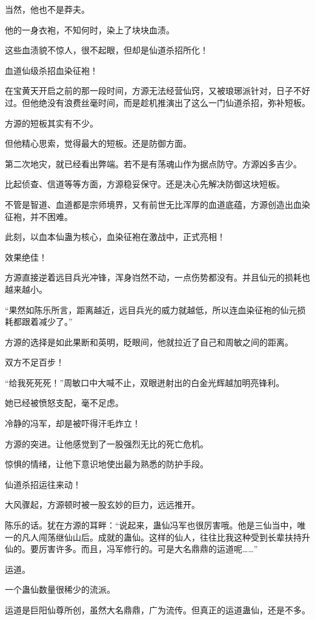 \begin{this_body}
当然，他也不是莽夫。

他的一身衣袍，不知何时，染上了块块血渍。

这些血渍貌不惊人，很不起眼，但却是仙道杀招所化！

血道仙级杀招血染征袍！

在宝黄天开启之前的那一段时间，方源无法经营仙窍，又被琅琊派针对，日子不好过。但他绝没有浪费丝毫时间，而是趁机推演出了这么一门仙道杀招，弥补短板。

方源的短板其实有不少。

但他精心思索，觉得最大的短板。还是防御方面。

第二次地灾，就已经看出弊端。若不是有荡魂山作为据点防守。方源凶多吉少。

比起侦查、信道等等方面，方源稳妥保守。还是决心先解决防御这块短板。

不管是智道、血道都是宗师境界，又有前世无比浑厚的血道底蕴，方源创造出血染征袍，并不困难。

此刻，以血本仙蛊为核心，血染征袍在激战中，正式亮相！

效果绝佳！

方源直接逆着远目兵光冲锋，浑身岿然不动，一点伤势都没有。并且仙元的损耗也越来越小。

“果然如陈乐所言，距离越近，远目兵光的威力就越低，所以连血染征袍的仙元损耗都跟着减少了。”

方源的选择是如此果断和英明，眨眼间，他就拉近了自己和周敏之间的距离。

双方不足百步！

“给我死死死！”周敏口中大喊不止，双眼迸射出的白金光辉越加明亮锋利。

她已经被愤怒支配，毫不足虑。

冷静的冯军，却是被吓得汗毛炸立！

方源的突进。让他感觉到了一股强烈无比的死亡危机。

惊惧的情绪，让他下意识地使出最为熟悉的防护手段。

仙道杀招运往来动！

大风骤起，方源顿时被一股玄妙的巨力，远远推开。

陈乐的话。犹在方源的耳畔：“说起来，蛊仙冯军也很厉害哦。他是三仙当中，唯一的凡人闯荡继仙山后。成就的蛊仙。这样的仙人，往往比我这种受到长辈扶持升仙的。要厉害许多。而且，冯军修行的。可是大名鼎鼎的运道呢……”

运道。

一个蛊仙数量很稀少的流派。

运道是巨阳仙尊所创，虽然大名鼎鼎，广为流传。但真正的运道蛊仙，还是不多。


\end{this_body}

